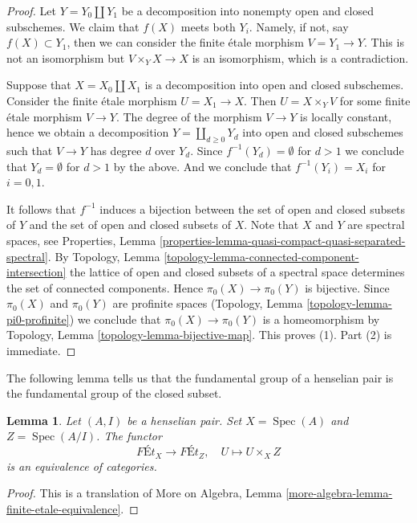 \documentclass{stacks-project}
\theoremstyle{plain}
\newtheorem{lemma}[subsection]{Lemma}
\theoremstyle{definition}
\theoremstyle{remark}
\numberwithin{equation}{subsection}
\def\Spec{\mathop{\mathrm{Spec}}}
\begin{document}
\begin{proof}
Let $Y = Y_0 \amalg Y_1$ be a decomposition into nonempty open and closed
subschemes. We claim that $f(X)$ meets both $Y_i$. Namely, if not,
say $f(X) \subset Y_1$, then we can consider the finite \'etale
morphism $V = Y_1 \to Y$. This is not an
isomorphism but $V \times_Y X \to X$ is an isomorphism, which is
a contradiction.

\medskip\noindent
Suppose that $X = X_0 \amalg X_1$ is a decomposition into open and closed
subschemes. Consider the finite \'etale morphism $U = X_1 \to X$. Then
$U = X \times_Y V$ for some finite \'etale morphism $V \to Y$. The degree
of the morphism $V \to Y$ is locally constant, hence we obtain a decomposition
$Y = \coprod_{d \geq 0} Y_d$ into open and closed subschemes
such that $V \to Y$ has degree $d$ over $Y_d$. Since
$f^{-1}(Y_d) = \emptyset$ for $d > 1$ we conclude that $Y_d = \emptyset$
for $d > 1$ by the above. And we conclude that $f^{-1}(Y_i) = X_i$
for $i = 0, 1$.

\medskip\noindent
It follows that $f^{-1}$ induces a bijection between the set of
open and closed subsets of $Y$ and the set of open and closed subsets of $X$.
Note that $X$ and $Y$ are spectral spaces, see Properties, Lemma
\ref{properties-lemma-quasi-compact-quasi-separated-spectral}.
By Topology, Lemma \ref{topology-lemma-connected-component-intersection}
the lattice of open and closed subsets of a spectral space
determines the set of connected components.
Hence $\pi_0(X) \to \pi_0(Y)$ is bijective. Since $\pi_0(X)$ and
$\pi_0(Y)$ are profinite spaces
(Topology, Lemma \ref{topology-lemma-pi0-profinite})
we conclude that $\pi_0(X) \to \pi_0(Y)$ is a homeomorphism by
Topology, Lemma \ref{topology-lemma-bijective-map}. This proves (1).
Part (2) is immediate.
\end{proof}

\noindent
The following lemma tells us that the fundamental group of a henselian
pair is the fundamental group of the closed subset.

\begin{lemma}
\label{lemma-gabber}
Let $(A, I)$ be a henselian pair. Set $X = \Spec(A)$ and $Z = \Spec(A/I)$.
The functor
$$
\textit{F\'Et}_X \longrightarrow \textit{F\'Et}_Z,\quad
U \longmapsto U \times_X Z
$$
is an equivalence of categories.
\end{lemma}

\begin{proof}
This is a translation of
More on Algebra, Lemma \ref{more-algebra-lemma-finite-etale-equivalence}.
\end{proof}
\end{document}
